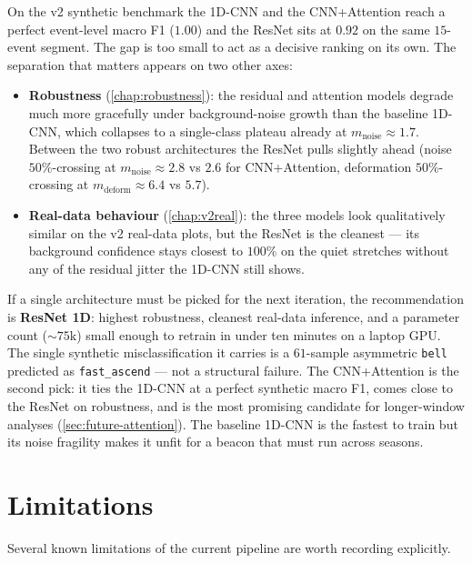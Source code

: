 On the v2 synthetic benchmark the 1D-CNN and the CNN+Attention reach
a perfect event-level macro F1 ($1.00$) and the ResNet sits at $0.92$
on the same $15$-event segment. The gap is too small to act as a
decisive ranking on its own. The separation that matters appears on
two other axes:
\begin{itemize}[leftmargin=*, itemsep=0.2em]
    \item \textbf{Robustness} (\cref{chap:robustness}): the residual
    and attention models degrade much more gracefully under
    background-noise growth than the baseline 1D-CNN, which collapses
    to a single-class plateau already at $m_{\text{noise}} \approx
    1.7$. Between the two robust architectures the ResNet pulls
    slightly ahead (noise $50\%$-crossing at $m_{\text{noise}}
    \approx 2.8$ vs $2.6$ for CNN+Attention, deformation
    $50\%$-crossing at $m_{\text{deform}} \approx 6.4$ vs $5.7$).
    \item \textbf{Real-data behaviour} (\cref{chap:v2real}): the three
    models look qualitatively similar on the v2 real-data plots, but
    the ResNet is the cleanest --- its background confidence stays
    closest to $100\%$ on the quiet stretches without any of the
    residual jitter the 1D-CNN still shows.
\end{itemize}

If a single architecture must be picked for the next iteration, the
recommendation is \textbf{ResNet 1D}: highest robustness, cleanest
real-data inference, and a parameter count ($\sim 75\text{k}$) small
enough to retrain in under ten minutes on a laptop GPU. The single
synthetic misclassification it carries is a $61$-sample asymmetric
\texttt{bell} predicted as \texttt{fast\_ascend} --- not a structural
failure. The CNN+Attention is the second pick: it ties the 1D-CNN at
a perfect synthetic macro F1, comes close to the ResNet on robustness,
and is the most promising candidate for longer-window analyses
(\cref{sec:future-attention}). The baseline 1D-CNN is the fastest to
train but its noise fragility makes it unfit for a beacon that must
run across seasons.

\section{Limitations}
\label{sec:conc-limits}

Several known limitations of the current pipeline are worth recording
explicitly.

